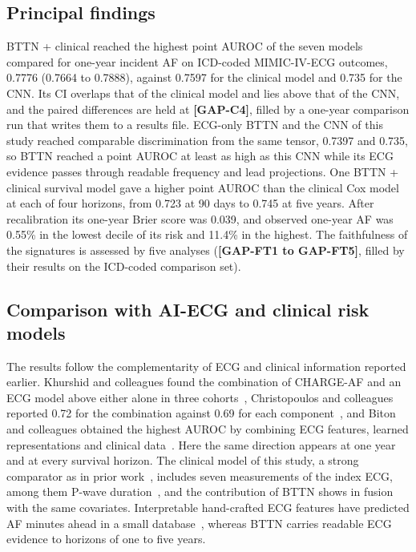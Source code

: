 \documentclass[preprint,12pt]{elsarticle}
\begin{document}
\subsection{Principal findings}

BTTN + clinical reached the highest point AUROC of the seven models compared for one-year incident AF on ICD-coded MIMIC-IV-ECG outcomes, 0.7776 (0.7664 to 0.7888), against 0.7597 for the clinical model and 0.735 for the CNN. Its CI overlaps that of the clinical model and lies above that of the CNN, and the paired differences are held at \textbf{[GAP-C4]}, filled by a one-year comparison run that writes them to a results file. ECG-only BTTN and the CNN of this study reached comparable discrimination from the same tensor, 0.7397 and 0.735, so BTTN reached a point AUROC at least as high as this CNN while its ECG evidence passes through readable frequency and lead projections. One BTTN + clinical survival model gave a higher point AUROC than the clinical Cox model at each of four horizons, from 0.723 at 90 days to 0.745 at five years. After recalibration its one-year Brier score was 0.039, and observed one-year AF was 0.55\% in the lowest decile of its risk and 11.4\% in the highest. The faithfulness of the signatures is assessed by five analyses (\textbf{[GAP-FT1 to GAP-FT5]}, filled by their results on the ICD-coded comparison set).

\subsection{Comparison with AI-ECG and clinical risk models}

The results follow the complementarity of ECG and clinical information reported earlier. Khurshid and colleagues found the combination of CHARGE-AF and an ECG model above either alone in three cohorts~\cite{khurshid2022}, Christopoulos and colleagues reported 0.72 for the combination against 0.69 for each component~\cite{christopoulos2020}, and Biton and colleagues obtained the highest AUROC by combining ECG features, learned representations and clinical data~\cite{biton2021}. Here the same direction appears at one year and at every survival horizon. The clinical model of this study, a strong comparator as in prior work~\cite{alonso2013}, includes seven measurements of the index ECG, among them P-wave duration~\cite{nielsen2015}, and the contribution of BTTN shows in fusion with the same covariates. Interpretable hand-crafted ECG features have predicted AF minutes ahead in a small database~\cite{hammer2022}, whereas BTTN carries readable ECG evidence to horizons of one to five years.
\end{document}
